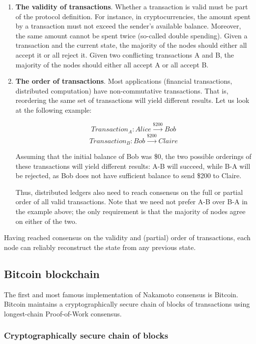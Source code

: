 \documentclass[12pt]{article}
\begin{document}
\begin{enumerate}
    \item \textbf{The validity of transactions}. Whether a transaction is valid must be part of the protocol definition. For instance, in cryptocurrencies, the amount spent by a transaction must not exceed the sender's available balance. Moreover, the same amount cannot be spent twice (so-called double spending). Given a transaction and the current state, the majority of the nodes should either all accept it or all reject it. Given two conflicting transactions A and B, the majority of the nodes should either all accept A or all accept B.

   \item \textbf{The order of transactions}. Most applications (financial transactions, distributed computation) have non-commutative transactions. That is, reordering the same set of transactions will yield different results. Let us look at the following example:

    $$Transaction_A: Alice \xrightarrow{\text{\$200}} Bob$$
    $$Transaction_B: Bob \xrightarrow{\text{\$200}} Claire$$

    Assuming that the initial balance of Bob was \$0, the two possible orderings of these transactions will yield different results: A-B will succeed, while B-A will be rejected, as Bob does not have sufficient balance to send \$200 to Claire.

    Thus, distributed ledgers also need to reach consensus on the full or partial order of all valid transactions. Note that we need not prefer A-B over B-A in the example above; the only requirement is that the majority of nodes agree on either of the two.
\end{enumerate}

Having reached consensus on the validity and (partial) order of transactions, each node can reliably reconstruct the state from any previous state.


\subsection{Bitcoin blockchain}

The first and most famous implementation of Nakamoto consensus is Bitcoin. Bitcoin maintains a cryptographically secure chain of blocks of transactions using longest-chain Proof-of-Work consensus.

\subsubsection{Cryptographically secure chain of blocks}
\end{document}
